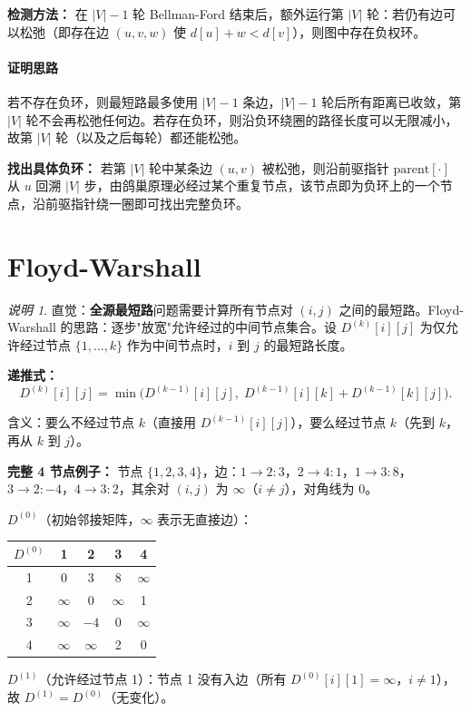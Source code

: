 \documentclass[UTF8,openany,12pt]{ctexbook}
\theoremstyle{remark}
\newtheorem{remark}{说明}[chapter]
\newcommand{\proofidea}[1]{\paragraph{证明思路}#1}
\begin{document}
\textbf{检测方法：} 在 $|V|-1$ 轮 Bellman-Ford 结束后，额外运行第 $|V|$ 轮：若仍有边可以松弛（即存在边 $(u,v,w)$ 使 $d[u]+w < d[v]$），则图中存在负权环。

\proofidea{若不存在负环，则最短路最多使用 $|V|-1$ 条边，$|V|-1$ 轮后所有距离已收敛，第 $|V|$ 轮不会再松弛任何边。若存在负环，则沿负环绕圈的路径长度可以无限减小，故第 $|V|$ 轮（以及之后每轮）都还能松弛。}

\textbf{找出具体负环：} 若第 $|V|$ 轮中某条边 $(u,v)$ 被松弛，则沿前驱指针 $\mathrm{parent}[\cdot]$ 从 $u$ 回溯 $|V|$ 步，由鸽巢原理必经过某个重复节点，该节点即为负环上的一个节点，沿前驱指针绕一圈即可找出完整负环。

\section{Floyd-Warshall}

\begin{remark}
直觉：\textbf{全源最短路}问题需要计算所有节点对 $(i,j)$ 之间的最短路。Floyd-Warshall 的思路：逐步"放宽"允许经过的中间节点集合。设 $D^{(k)}[i][j]$ 为仅允许经过节点 $\{1,\ldots,k\}$ 作为中间节点时，$i$ 到 $j$ 的最短路长度。
\end{remark}

\textbf{递推式：}
\[
  D^{(k)}[i][j] = \min\!\bigl(D^{(k-1)}[i][j],\; D^{(k-1)}[i][k] + D^{(k-1)}[k][j]\bigr).
\]

含义：要么不经过节点 $k$（直接用 $D^{(k-1)}[i][j]$），要么经过节点 $k$（先到 $k$，再从 $k$ 到 $j$）。

\textbf{完整 4 节点例子：} 节点 $\{1,2,3,4\}$，边：$1\to2:3$，$2\to4:1$，$1\to3:8$，$3\to2:-4$，$4\to3:2$，其余对 $(i,j)$ 为 $\infty$（$i\ne j$），对角线为 $0$。

$D^{(0)}$（初始邻接矩阵，$\infty$ 表示无直接边）：
\begin{center}
\begin{tabular}{@{}c|cccc@{}}
\toprule
$D^{(0)}$ & 1 & 2 & 3 & 4 \\
\midrule
1 & 0        & 3        & 8        & $\infty$ \\
2 & $\infty$ & 0        & $\infty$ & 1        \\
3 & $\infty$ & $-4$     & 0        & $\infty$ \\
4 & $\infty$ & $\infty$ & 2        & 0        \\
\bottomrule
\end{tabular}
\end{center}

$D^{(1)}$（允许经过节点 1）：节点 1 没有入边（所有 $D^{(0)}[i][1] = \infty$，$i\ne 1$），故 $D^{(1)} = D^{(0)}$（无变化）。
\end{document}
